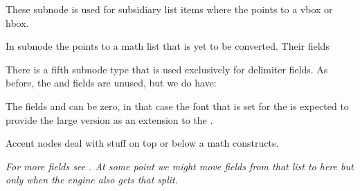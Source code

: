 

\stopsubsection

\startsubsection[title=subbox]

These  subnode is used for subsidiary list items where
the  points to a  vbox or hbox.



\stopsubsection

\startsubsection[title=submlist]

In  subnode the  points to a math list that is yet to
be converted. Their fields



\stopsubsection

\startsubsection[title={delimiter}]

There is a fifth subnode type that is used exclusively for delimiter fields. As
before, the  and  fields are unused, but we do have:


The fields  and  can be zero, in that case
the font that is set for the  is expected to provide the large
version as an extension to the .


\stopsubsection

\startsubsection[title={accent}]

Accent nodes deal with stuff on top or below a math constructs.


{\em For more fields see . At some point we might move fields from
that list to here but only when the engine also gets that split.}


\stopsubsection

\startsubsection[title={style}]

